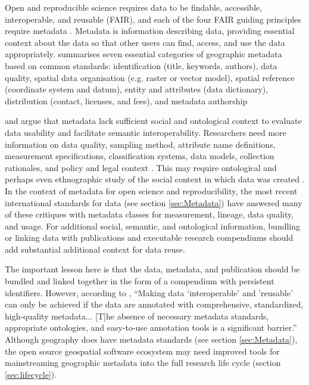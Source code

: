 \documentclass{isprs} %
\begin{document}
Open and reproducible science requires data to be findable, accessible, interoperable, and reusable (FAIR), and each of the four FAIR guiding principles require metadata \citep{Wilkinson2016, NASEM2018}.
Metadata is information describing data, providing essential context about the data so that other users can find, access, and use the data appropriately.
\citet{Kim1999} summarises seven essential categories of geographic metadata based on common standards: identification (title, keywords, authors), data quality, spatial data organisation (e.g. raster or vector model), spatial reference (coordinate system and datum), entity and attributes (data dictionary), distribution (contact, licenses, and fees), and metadata authorship

\citet{Schuurman2006} and \citet{Comber2008} argue that metadata lack sufficient social and ontological context to evaluate data usability and facilitate semantic interoperability.
Researchers need more information on data quality, sampling method, attribute name definitions, measurement specifications, classification systems, data models, collection rationales, and policy and legal context \citep{Schuurman2006}.
This may require ontological and perhaps even ethnographic study of the social context in which data was created \citep{Schuurman2008}.
In the context of metadata for open science and reproducibility, the most recent international standards for data (see section \ref{sec:Metadata}) have answered many of these critiques with metadata classes for measurement, lineage, data quality, and usage.
For additional social, semantic, and ontological information, bundling or linking data with publications and executable research compendiums should add substantial additional context for data reuse.

The important lesson here is that the data, metadata, and publication should be bundled and linked together in the form of a compendium with persistent identifiers.
However, according to \citet[137-8]{NASEM2018}, ``Making data `interoperable' and 'reusable' can only be achieved if the data are annotated with comprehensive, standardized, high-quality metadata... [T]he absence of necessary metadata standards, appropriate ontologies, and easy-to-use annotation tools is a significant barrier.''
Although geography does have metadata standards (see section \ref{sec:Metadata}), the open source geospatial software ecosystem may need improved tools for mainstreaming geographic metadata into the full research life cycle (section \ref{sec:lifecycle}).
\end{document}
